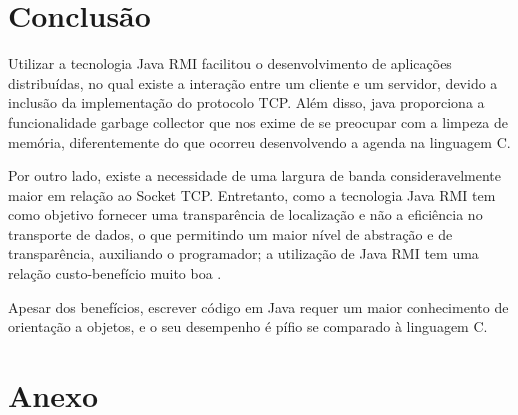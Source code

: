 \documentclass[10pt,a4paper]{article}
\begin{document}
\section{Conclusão}

Utilizar a tecnologia Java RMI facilitou o desenvolvimento de aplicações distribuídas,
no qual existe a interação entre um cliente e um servidor, devido a inclusão da implementação 
do protocolo TCP. Além disso, java proporciona a funcionalidade garbage collector que nos exime de
se preocupar com a limpeza de memória, diferentemente do que ocorreu desenvolvendo a agenda na linguagem C.

Por outro lado, existe a necessidade de uma largura de banda consideravelmente
maior em relação ao Socket TCP. Entretanto, como a tecnologia Java RMI
tem como objetivo fornecer uma transparência de localização e não a eficiência no
transporte de dados, o que permitindo um maior nível de abstração e de transparência,
auxiliando o programador; a utilização de Java RMI tem uma relação custo-benefício muito boa .

Apesar dos benefícios, escrever código em Java requer um maior conhecimento de orientação a objetos,
e o seu desempenho é pífio se comparado à linguagem C.



\begin{small}
  
\end{small}
\newpage
\section{Anexo}

\end{document}
